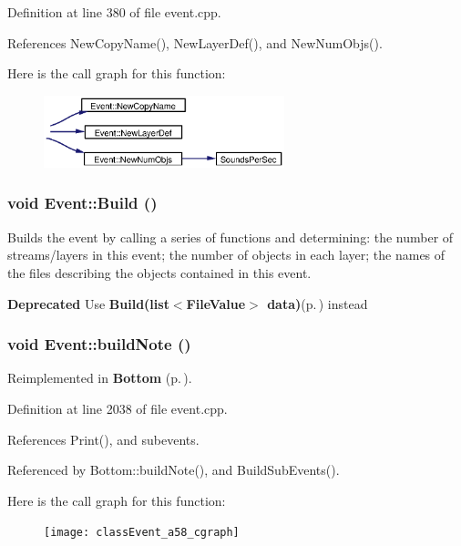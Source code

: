 Definition at line 380 of file event.cpp.

References New\-Copy\-Name(), New\-Layer\-Def(), and New\-Num\-Objs().

Here is the call graph for this function:\begin{figure}[H]
\begin{center}
\leavevmode
\includegraphics[width=198pt]{classEvent_a21_cgraph}
\end{center}
\end{figure}
\subsubsection{\setlength{\rightskip}{0pt plus 5cm}void Event::Build ()}\label{classEvent_a20}


Builds the event by calling a series of functions and determining: the number of streams/layers in this event; the number of objects in each layer; the names of the files describing the objects contained in this event. 

\begin{Desc}
\item[{\bf Deprecated}]Use {\bf Build(list$<$File\-Value$>$ data)}{\rm (p.\,\pageref{classEvent_a21})} instead \end{Desc}
\subsubsection{\setlength{\rightskip}{0pt plus 5cm}void Event::build\-Note ()\hspace{0.3cm}{\tt  [virtual]}}\label{classEvent_a58}




Reimplemented in {\bf Bottom} {\rm (p.\,\pageref{classBottom_a32})}.

Definition at line 2038 of file event.cpp.

References Print(), and subevents.

Referenced by Bottom::build\-Note(), and Build\-Sub\-Events().

Here is the call graph for this function:\begin{figure}[H]
\begin{center}
\leavevmode
\texttt{[image: classEvent\_a58\_cgraph]}
\end{center}
\end{figure}
